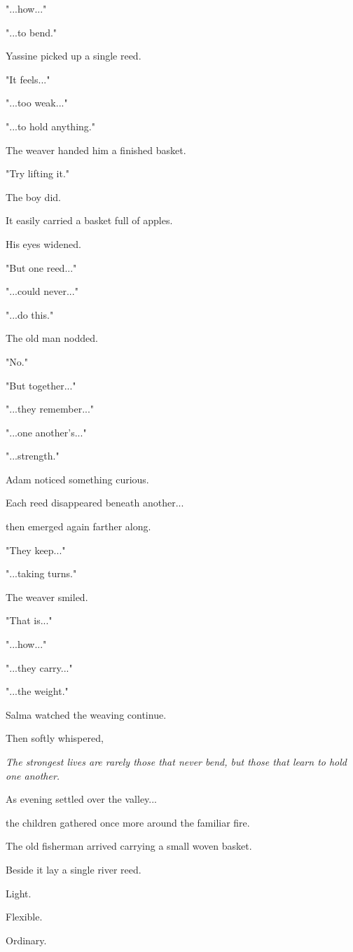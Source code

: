 \documentclass[12pt,openany]{book}
\begin{document}
"...how..."

"...to bend."

Yassine picked up a single reed.

"It feels..."

"...too weak..."

"...to hold anything."

The weaver handed him a finished basket.

"Try lifting it."

The boy did.

It easily carried a basket full of apples.

His eyes widened.

"But one reed..."

"...could never..."

"...do this."

The old man nodded.

"No."

"But together..."

"...they remember..."

"...one another's..."

"...strength."

Adam noticed something curious.

Each reed disappeared beneath another...

then emerged again farther along.

"They keep..."

"...taking turns."

The weaver smiled.

"That is..."

"...how..."

"...they carry..."

"...the weight."

Salma watched the weaving continue.

Then softly whispered,

\emph{The strongest lives are rarely those that never bend, but those that learn to hold one another.}

As evening settled over the valley...

the children gathered once more around the familiar fire.

The old fisherman arrived carrying a small woven basket.

Beside it lay a single river reed.

Light.

Flexible.

Ordinary.
\end{document}
